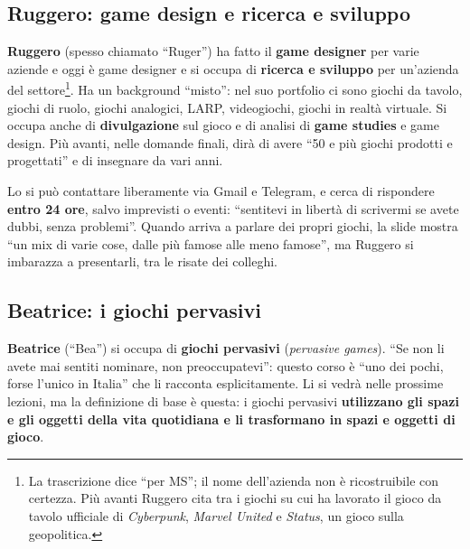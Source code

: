 \subsection{Ruggero: game design e ricerca e sviluppo}



\textbf{Ruggero} (spesso chiamato ``Ruger'') ha fatto il \textbf{game designer}
per varie aziende e oggi è game designer e si occupa di \textbf{ricerca e
sviluppo} per un'azienda del settore\footnote{La trascrizione dice ``per MS'';
il nome dell'azienda non è ricostruibile con certezza. Più avanti Ruggero cita
tra i giochi su cui ha lavorato il gioco da tavolo ufficiale di
\emph{Cyberpunk}, \emph{Marvel United} e \emph{Status}, un gioco sulla
geopolitica.}. Ha un background ``misto'': nel suo portfolio ci sono giochi da
tavolo, giochi di ruolo, giochi analogici, LARP, videogiochi, giochi in realtà
virtuale. Si occupa anche di \textbf{divulgazione} sul gioco e di analisi di
\textbf{game studies} e game design. Più avanti, nelle domande finali, dirà di
avere ``50 e più giochi prodotti e progettati'' e di insegnare da vari anni.

Lo si può contattare liberamente via Gmail e Telegram, e cerca di rispondere
\textbf{entro 24 ore}, salvo imprevisti o eventi: ``sentitevi in libertà di
scrivermi se avete dubbi, senza problemi''. Quando arriva a parlare dei propri
giochi, la slide mostra ``un mix di varie cose, dalle più famose alle meno
famose'', ma Ruggero si imbarazza a presentarli, tra le risate dei colleghi.

\subsection{Beatrice: i giochi pervasivi}



\textbf{Beatrice} (``Bea'') si occupa di \textbf{giochi pervasivi}
(\emph{pervasive games}). ``Se non li avete mai sentiti nominare, non
preoccupatevi'': questo corso è ``uno dei pochi, forse l'unico in Italia'' che
li racconta esplicitamente. Li si vedrà nelle prossime lezioni, ma la definizione
di base è questa: i giochi pervasivi \textbf{utilizzano gli spazi e gli oggetti
della vita quotidiana e li trasformano in spazi e oggetti di gioco}.

